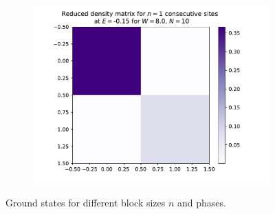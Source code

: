 \documentclass[reprint,amsmath,amssymb,aps,prb]{revtex4-2}
\begin{document}
\begin{center}
\begin{figure}[h!]
\begin{subfigure}[c]{0.45\textwidth}
		\end{subfigure}
		\begin{subfigure}[c]{0.45\textwidth}
			\includegraphics[width=\linewidth]{../results/groundstates/N10n1_trainingset_groundstate_Wmax8.0}
		\end{subfigure}
		\caption{Ground states for different block sizes $n$ and phases.}
		\label{fig:groundstates_loc}
\end{figure}
\end{center}
\end{document}
